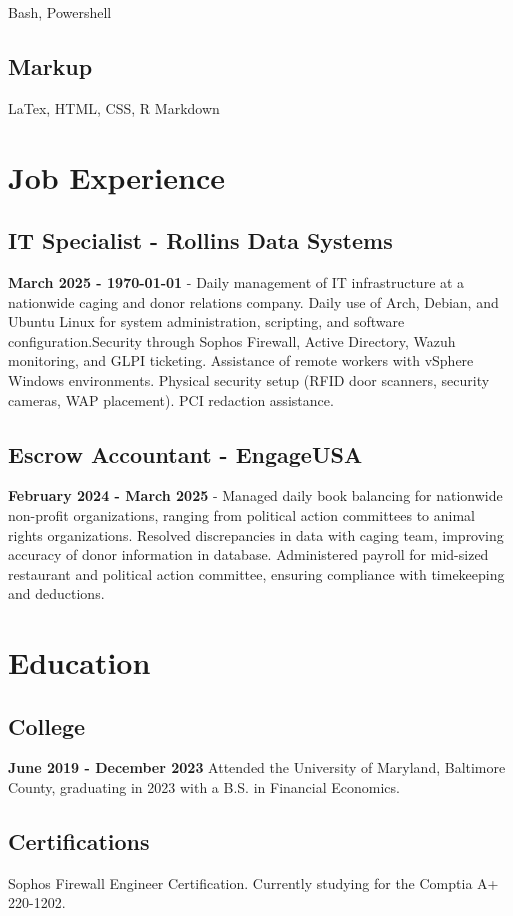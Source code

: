 \documentclass{article}
\begin{document}
Bash, Powershell

\subsection{Markup}

LaTex, HTML, CSS, R Markdown


\section{Job Experience}

\subsection{IT Specialist - Rollins Data Systems}
\textbf{March 2025 - \monthyeardate\today} - Daily management of IT infrastructure at a nationwide caging and donor relations company. Daily use of Arch, Debian, and Ubuntu Linux for system administration, scripting, and software configuration.Security through Sophos Firewall, Active Directory, Wazuh monitoring, and GLPI ticketing. Assistance of remote workers with vSphere Windows environments. Physical security setup (RFID door scanners, security cameras, WAP placement). PCI redaction assistance.

\subsection{Escrow Accountant - EngageUSA}
\textbf{February 2024 - March 2025} - Managed daily book balancing for nationwide non-profit organizations, ranging from political action committees to animal rights organizations. Resolved discrepancies in data with caging team, improving accuracy of donor information in database. Administered payroll for mid-sized restaurant and political action committee, ensuring compliance with timekeeping and deductions.

\section{Education}

\subsection{College} \textbf{June 2019 - December 2023}
Attended the University of Maryland, Baltimore County, graduating in 2023 with a B.S. in Financial Economics. 

\subsection{Certifications}

Sophos Firewall Engineer Certification. Currently studying for the Comptia A+ 220-1202. 
\end{document}
